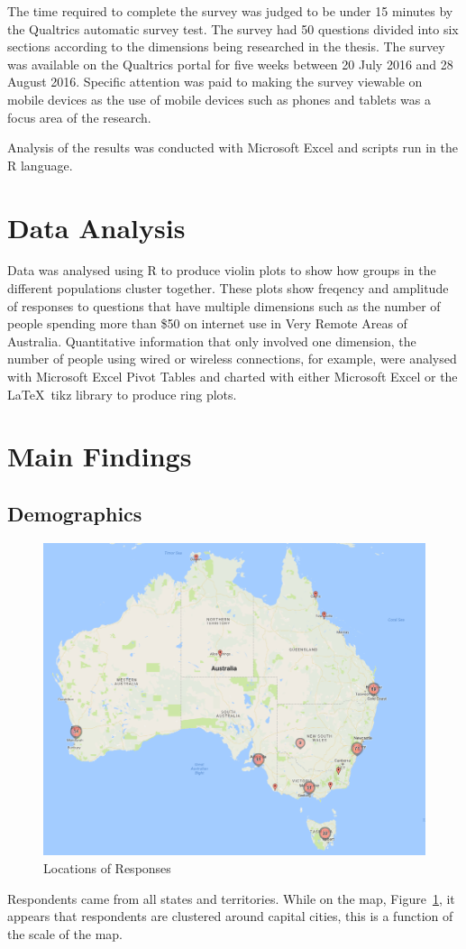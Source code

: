 The time required to complete the survey was judged to be under 15 minutes by the Qualtrics automatic survey test. The survey had 50 questions divided into six sections according to the dimensions being researched in the thesis. The survey was available on the Qualtrics portal for five weeks between 20 July 2016 and 28 August 2016. Specific attention was paid to making the survey viewable on mobile devices as the use of mobile devices such as phones and tablets was a focus area of the research.

Analysis of the results was conducted with Microsoft Excel and scripts run in the R language. 


\section{Data Analysis}
Data was analysed using R to produce violin plots to show how groups in the different populations cluster together. These plots show freqency and amplitude of responses to questions that have multiple dimensions such as the number of people spending more than \$50 on internet use in Very Remote Areas of Australia. Quantitative information that only involved one dimension, the number of people using wired or wireless connections, for example, were analysed with Microsoft Excel Pivot Tables and charted with either Microsoft Excel or the \LaTeX ~tikz library to produce ring plots.


\section{Main Findings}
\subsection{Demographics}
\begin{figure}
\centering
\includegraphics[scale=0.5]{figures/ResponsesMap.png} 
\caption{Locations of Responses}
\label{fig:ResponsesMap}
\end{figure}
Respondents came from all states and territories. While on the map, Figure~\ref{fig:ResponsesMap}, it appears that respondents are clustered around capital cities, this is a function of the scale of the map.



